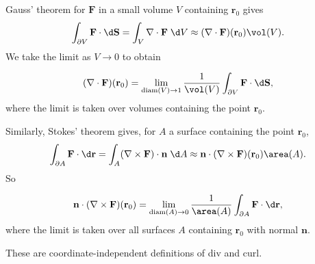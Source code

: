 \documentclass[a4paper]{article}
\begin{document}
Gauss' theorem for $\mathbf{F}$ in a small volume $V$ containing $\mathbf{r}_0$ gives
\[
  \int_{\partial V}\mathbf{F}\cdot \d \mathbf{S} = \int_V\nabla\cdot \mathbf{F}\;\d V\approx (\nabla\cdot \mathbf{F})(\mathbf{r}_0) \vol(V).
\]
We take the limit as $V\to 0$ to obtain
\begin{prop}
  \[
    (\nabla \cdot \mathbf{F})(\mathbf{r}_0) = \lim_{\mathrm{diam}(V) \to 1} \frac{1}{\vol(V)}\int_{\partial V}\mathbf{F}\cdot \d \mathbf{S},
  \]
  where the limit is taken over volumes containing the point $\mathbf{r}_0$.
\end{prop}
Similarly, Stokes' theorem gives, for $A$ a surface containing the point $\mathbf{r}_0$,
\[
  \int _{\partial A}\mathbf{F}\cdot \d \mathbf{r} = \int_A(\nabla\times \mathbf{F})\cdot \mathbf{n}\;\d A \approx \mathbf{n}\cdot (\nabla\times \mathbf{F})(\mathbf{r}_0) \area(A).
\]
So
\begin{prop}
  \[
    \mathbf{n}\cdot (\nabla \times \mathbf{F})(\mathbf{r}_0) = \lim_{\mathrm{diam}(A) \to 0}\frac{1}{\area(A)}\int_{\partial A}\mathbf{F}\cdot \d \mathbf{r},
  \]
  where the limit is taken over all surfaces $A$ containing $\mathbf{r}_0$ with normal $\mathbf{n}$.
\end{prop}
These are coordinate-independent definitions of div and curl.
\end{document}
